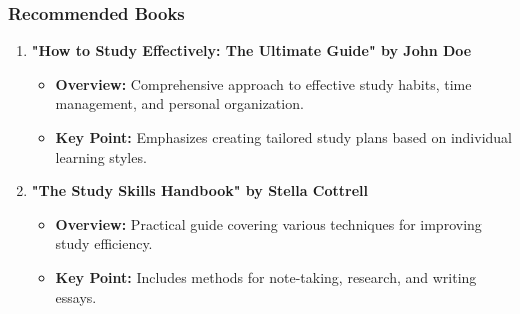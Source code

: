 \documentclass[aspectratio=169]{beamer}
\begin{document}
\begin{frame}[fragile]
    \frametitle{Recommended Books}
    \begin{enumerate}
        \item \textbf{"How to Study Effectively: The Ultimate Guide" by John Doe}
        \begin{itemize}
            \item \textbf{Overview:} Comprehensive approach to effective study habits, time management, and personal organization.
            \item \textbf{Key Point:} Emphasizes creating tailored study plans based on individual learning styles.
        \end{itemize}

        \item \textbf{"The Study Skills Handbook" by Stella Cottrell}
        \begin{itemize}
            \item \textbf{Overview:} Practical guide covering various techniques for improving study efficiency.
            \item \textbf{Key Point:} Includes methods for note-taking, research, and writing essays.
        \end{itemize}
    \end{enumerate}
\end{frame}
\end{document}
